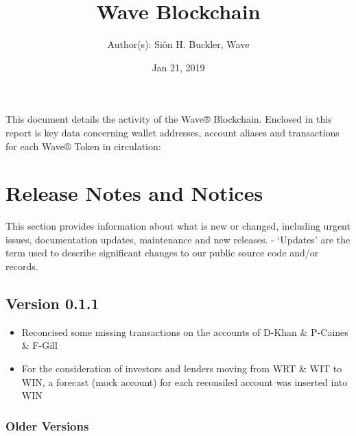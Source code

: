 \documentclass[letterpaper,10pt,openany,oneside,english]{sphinxmanual}
\title{Wave Blockchain}
\date{Jan 21, 2019}
\author{Author(s): Siôn H. Buckler, Wave}
\begin{document}
\maketitle
\sphinxtableofcontents
{}\label{\detokenize{index::doc}}


This document details the activity of the Wave® Blockchain.
Enclosed in this report is key data concerning wallet addresses, account aliases and transactions for each Wave® Token in circulation:


\chapter{Release Notes and Notices}
\label{\detokenize{releasenotes:release-notes-and-notices}}\label{\detokenize{releasenotes::doc}}
This section provides information about what is new or changed, including urgent issues, documentation updates, maintenance and new releases.
- ‘Updates’ are the term used to describe significant changes to our public source code and/or records.


\section{Version 0.1.1}
\label{\detokenize{releasenotes:version-0-1-1}}\begin{itemize}
\item {} 
Reconcised some missing transactions on the accounts of D-Khan \& P-Caines \& F-Gill

\item {} 
For the consideration of investors and lenders moving from WRT \& WIT to WIN, a forecast (mock account) for each reconsiled account was inserted into WIN

\end{itemize}


\subsection{Older Versions}
\label{\detokenize{releasenotes:older-versions}}
\end{document}
